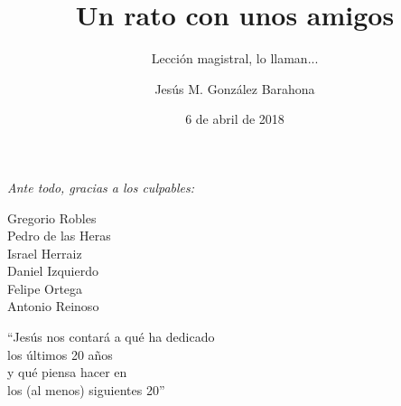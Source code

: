 \documentclass[17pt,aspectratio=169]{beamer}
\title[Rato con amigos]{Un rato con unos amigos}
\subtitle{Lección magistral, lo llaman...}
\author[Jesús M. González Barahona]{Jesús M. González Barahona}
\institute[URJC]{Universidad Rey Juan Carlos}
\date{6 de abril de 2018}
\begin{document}
\begin{frame}
  \maketitle
\end{frame}


\begin{frame}

  {\em
    Ante todo, gracias a los culpables:

    \begin{flushright}
    Gregorio Robles \\
    Pedro de las Heras \\
    Israel Herraiz \\
    Daniel Izquierdo \\
    Felipe Ortega \\
    Antonio Reinoso \\
    \end{flushright}
  }
\end{frame}

\begin{frame}

  {\em
    \begin{center}
      ``Jesús nos contará a qué ha dedicado \\
      los últimos 20 años \\
      y qué piensa hacer en \\
      los (al menos) siguientes 20''\\
    \end{center}
  }
\end{frame}


\frame{
\tableofcontents
}





\end{document}
